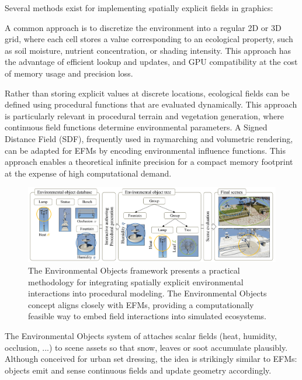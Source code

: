 Several methods exist for implementing spatially explicit fields in graphics:
\begin{Itemize}
    \Item{} A common approach is to discretize the environment into a regular 2D or 3D grid, where each cell stores a value corresponding to an ecological property, such as soil moisture, nutrient concentration, or shading intensity. This approach has the advantage of efficient lookup and updates, and GPU compatibility at the cost of memory usage and precision loss. 

    \Item{} Rather than storing explicit values at discrete locations, ecological fields can be defined using procedural functions that are evaluated dynamically. This approach is particularly relevant in procedural terrain and vegetation generation, where continuous field functions determine environmental parameters. A Signed Distance Field (SDF), frequently used in raymarching and volumetric rendering, can be adapted for EFMs by encoding environmental influence functions. This approach enables a theoretical infinite precision for a compact memory footprint at the expense of high computational demand.
\end{Itemize}


\begin{figure}[H]
    \centering
    \includegraphics[width = .8 \linewidth]{env-objs-Grosbellet2016.png}
    \caption{The Environmental Objects framework \cite{Grosbellet2016} presents a practical methodology for integrating spatially explicit environmental interactions into procedural modeling. The Environmental Objects concept aligns closely with EFMs, providing a computationally feasible way to embed field interactions into simulated ecosystems.}
    \label{fig:env-obj_teaser-grosbellet2016}
\end{figure}

The Environmental Objects system of \citep{Grosbellet2016} attaches scalar fields (heat, humidity, occlusion, ...) to scene assets so that snow, leaves or soot accumulate plausibly. Although conceived for urban set dressing, the idea is strikingly similar to EFMs: objects emit and sense continuous fields and update geometry accordingly.

